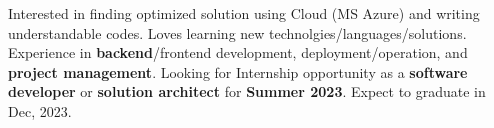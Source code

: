 

\begin{cvparagraph}

  Interested in finding optimized solution using Cloud (MS Azure) and writing understandable codes. Loves learning new technolgies/languages/solutions. Experience in \textbf{backend}/frontend development, deployment/operation, and \textbf{project management}.
  Looking for Internship opportunity as a \textbf{software developer} or \textbf{solution architect} for \textbf{Summer 2023}. Expect to graduate in Dec, 2023.
\end{cvparagraph}
